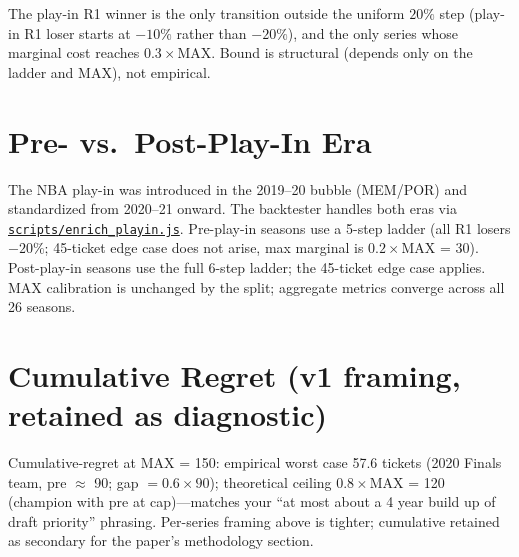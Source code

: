 \documentclass[10pt,letterpaper]{article}
\begin{document}
{\footnotesize The play-in R1 winner is the only transition outside the uniform $20\%$ step (play-in R1 loser starts at $-10\%$ rather than $-20\%$), and the only series whose marginal cost reaches $0.3 \times \text{MAX}$. Bound is structural (depends only on the ladder and MAX), not empirical.}

\section*{Pre- vs.\ Post-Play-In Era}

The NBA play-in was introduced in the 2019--20 bubble (MEM/POR) and standardized from 2020--21 onward. The backtester handles both eras via \href{../scripts/enrich_playin.js}{\texttt{scripts/enrich\_playin.js}}. Pre-play-in seasons use a 5-step ladder (all R1 losers $-20\%$; 45-ticket edge case does not arise, max marginal is $0.2 \times \text{MAX}$ = 30). Post-play-in seasons use the full 6-step ladder; the 45-ticket edge case applies. MAX calibration is unchanged by the split; aggregate metrics converge across all 26 seasons.

\section*{Cumulative Regret (v1 framing, retained as diagnostic)}

Cumulative-regret at MAX = 150: empirical worst case 57.6 tickets (2020 Finals team, pre $\approx$ 90; gap $= 0.6 \times 90$); theoretical ceiling $0.8 \times \text{MAX}$ = 120 (champion with pre at cap)---matches your ``at most about a 4 year build up of draft priority'' phrasing. Per-series framing above is tighter; cumulative retained as secondary for the paper's methodology section.
\end{document}
